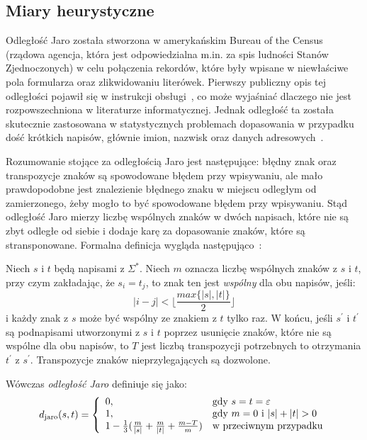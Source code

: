 \documentclass{praca1}
\begin{document}
\subsection{Miary heurystyczne}


Odległość Jaro została stworzona w amerykańskim Bureau of the Census (rządowa agencja, która jest odpowiedzialna m.in. za spis ludności Stanów Zjednoczonych) w celu połączenia rekordów, które były wpisane w niewłaściwe pola formularza oraz zlikwidowaniu literówek. Pierwszy publiczny opis tej odległości pojawił się w instrukcji obsługi~\cite{Jaro1978:usermanual}, co może wyjaśniać dlaczego nie jest rozpowszechniona w literaturze informatycznej. Jednak odległość ta została skutecznie zastosowana w statystycznych problemach dopasowania w przypadku dość krótkich napisów, głównie imion, nazwisk oraz danych adresowych~\cite{Loo2014:stringdist}.

Rozumowanie stojące za odległością Jaro jest następujące: błędny znak oraz transpozycje znaków są spowodowane błędem przy wpisywaniu, ale mało prawdopodobne jest znalezienie błędnego znaku w miejscu odległym od zamierzonego, żeby mogło to być spowodowane błędem przy wpisywaniu. Stąd odległość Jaro mierzy liczbę wspólnych znaków w dwóch napisach, które nie są zbyt odległe od siebie i dodaje karę za dopasowanie znaków, które są stransponowane. Formalna definicja wygląda następująco~\cite{Loo2014:stringdist}:

\begin{definition}
Niech $s$ i $t$ będą napisami z $\Sigma^*$. Niech $m$ oznacza liczbę wspólnych znaków z $s$ i $t$, przy czym zakładając, że $s_i = t_j$, to znak ten jest \emph{wspólny} dla obu napisów, jeśli:
\begin{equation*}
|i -j| < \Bigg\lfloor\frac{max\{|s|, |t|\}}{2}\Bigg\rfloor
\end{equation*}
i każdy znak z $s$ może być wspólny ze znakiem z $t$ tylko raz. W końcu, jeśli $s^\prime$ i $t^\prime$ są podnapisami utworzonymi z $s$ i $t$ poprzez usunięcie znaków, które nie są wspólne dla obu napisów, to $T$ jest liczbą transpozycji potrzebnych to otrzymania $t^\prime$ z $s^\prime$. Transpozycje znaków nieprzylegających są dozwolone.

Wówczas \emph{odległość Jaro} definiuje się jako:
\begin{equation}
\label{eq:011}
d_{\mathrm{jaro}}(s,t) = \left\{
\begin{array}{l l}     
    0, & \text{gdy } s = t = \varepsilon \\
    1, & \text{gdy } m = 0 \text{ i } |s| + |t| > 0 \\
    1 - \frac{1}{3} (\frac{m}{|s|} + \frac{m}{|t|} + \frac{m - T}{m}) & \text{w przeciwnym przypadku}
\end{array}\right.
\end{equation}
\end{definition}
\end{document}
